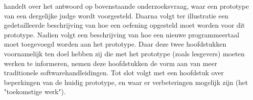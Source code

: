  handelt over het antwoord op bovenstaande onderzoeksvraag, waar een prototype van een dergelijke judge wordt voorgesteld.
Daarna volgt ter illustratie een gedetailleerde beschrijving van hoe een oefening opgesteld moet worden voor dit prototype.
Nadien volgt een beschrijving van hoe een nieuwe programmeertaal moet toegevoegd worden aan het prototype.
Daar deze twee hoofdstukken voornamelijk ten doel hebben zij die met het prototype (zoals lesgevers) moeten werken te informeren, nemen deze hoofdstukken de vorm aan van meer traditionele softwarehandleidingen.
Tot slot volgt met een hoofdstuk over beperkingen van de huidig prototype, en waar er verbeteringen mogelijk zijn (het "toekomstige werk").
